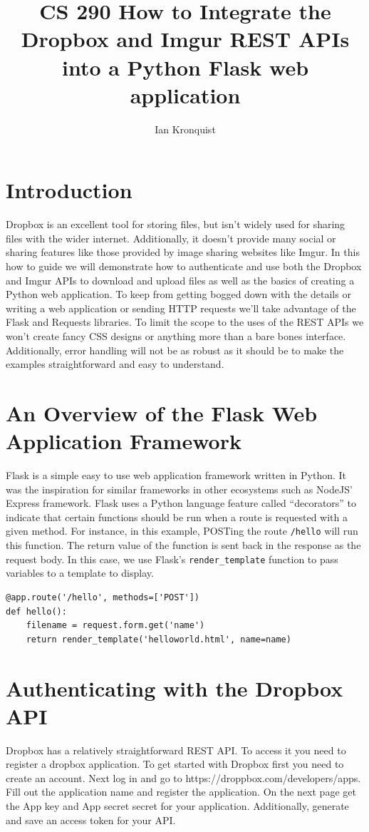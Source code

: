 \documentclass[12pt]{article}
\title{CS 290 How to Integrate the Dropbox and Imgur REST APIs into a Python Flask web application}
\author{Ian Kronquist}
\begin{document}
\maketitle

\section{Introduction}

Dropbox is an excellent tool for storing files, but isn't widely used for sharing files with the wider internet. Additionally, it doesn't provide many social or sharing features like those provided by image sharing websites like Imgur. In this how to guide we will demonstrate how to authenticate and use both the Dropbox and Imgur APIs to download and upload files as well as the basics of creating a Python web application. To keep from getting bogged down with the details or writing a web application or sending HTTP requests we'll take advantage of the Flask and Requests libraries. To limit the scope to the uses of the REST APIs we won't create fancy CSS designs or anything more than a bare bones interface. Additionally, error handling will not be as robust as it should be to make the examples straightforward and easy to understand.


\section{An Overview of the Flask Web Application Framework}
Flask is a simple easy to use web application framework written in Python. It was the inspiration for similar frameworks in other ecosystems such as NodeJS' Express framework. Flask uses a Python language feature called ``decorators'' to indicate that certain functions should be run when a route is requested with a given method. For instance, in this example, POSTing the route \texttt{/hello} will run this function. The return value of the function is sent back in the response as the request body. In this case, we use Flask's \texttt{render\_template} function to pass variables to a template to display.

\begin{lstlisting}
@app.route('/hello', methods=['POST'])
def hello():
    filename = request.form.get('name')
    return render_template('helloworld.html', name=name)
\end{lstlisting}


\section{Authenticating with the Dropbox API}
Dropbox has a relatively straightforward REST API. To access it you need to register a dropbox application. To get started with Dropbox first you need to create an account. Next log in and go to https://droppbox.com/developers/apps. Fill out the application name and register the application. On the next page get the App key and App secret secret for your application. Additionally, generate and save an access token for your API.
\end{document}
